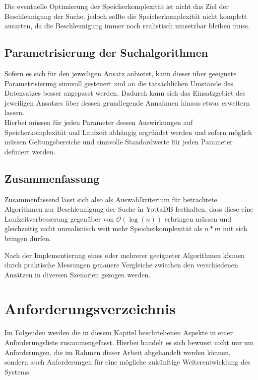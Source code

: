 \documentclass[oneside]{ausarbeitung}
\begin{document}
Die eventuelle Optimierung der Speicherkomplexität ist nicht das Ziel der Beschleunigung der Suche, jedoch sollte die Speicherkomplexität nicht komplett ausarten, da die Beschleunigung immer noch realistisch umsetzbar bleiben muss.
	
	
	
\subsection{Parametrisierung der Suchalgorithmen}
	
Sofern es sich für den jeweiligen Ansatz anbietet, kann dieser über geeignete Parametrisierung sinnvoll gesteuert und an die tatsächlichen Umstände des Datensatzes besser angepasst werden. Dadurch kann sich das Einsatzgebiet des jeweiligen Ansatzes über dessen grundlegende Annahmen hinaus etwas erweitern lassen. \\
Hierbei müssen für jeden Parameter dessen Auswirkungen auf Speicherkomplexität und Laufzeit abhängig ergründet werden und sofern möglich müssen Geltungsbereiche und sinnvolle Standardwerte für jeden Parameter definiert werden.
	
	
	
\subsection{Zusammenfassung}
	
Zusammenfassend lässt sich also als Auswahlkriterium für betrachtete Algorithmen zur Beschleunigung der Suche in YottaDB festhalten, dass diese eine Laufzeitverbesserung gegenüber von $\mathcal{O}(\log(n))$ erbringen müssen und gleichzeitig nicht unrealistisch weit mehr Speicherkomplexität als $n*m$ mit sich bringen dürfen.
	
Nach der Implementierung eines oder mehrerer geeigneter Algorithmen können durch praktische Messungen genauere Vergleiche zwischen den verschiedenen Ansätzen in diversen Szenarien gezogen werden. 
	
	
	
	
\pagebreak
	
\section{Anforderungsverzeichnis}

Im Folgenden werden die in diesem Kapitel beschriebenen Aspekte in einer Anforderungsliste zusammengefasst. Hierbei handelt es sich bewusst nicht nur um Anforderungen, die im Rahmen dieser Arbeit abgehandelt werden können, sondern auch Anforderungen für eine mögliche zukünftige Weiterentwicklung des Systems.
	
\end{document}
